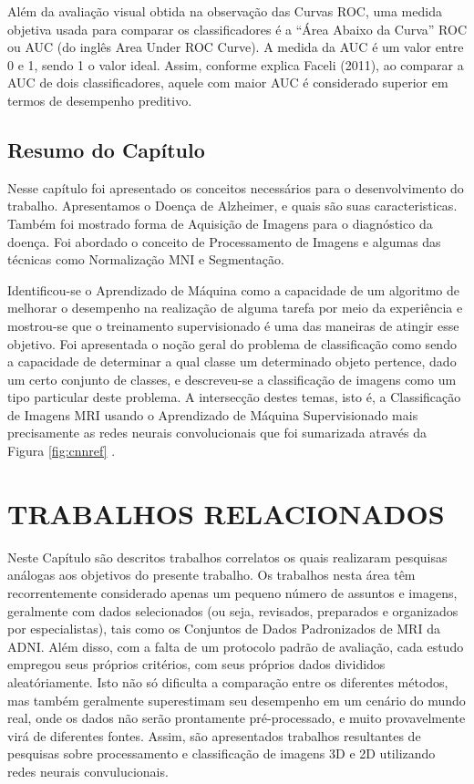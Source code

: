 \documentclass[openright]{UFRGS} %
\begin{document}
Além da avaliação visual obtida na observação das Curvas ROC, uma medida
objetiva usada para comparar os classificadores é a “Área Abaixo da Curva” ROC ou AUC (do inglês Area Under ROC Curve). A medida da AUC é um valor entre 0 e 1, sendo 1 o valor ideal. Assim, conforme explica Faceli (2011), ao comparar a AUC de dois
classificadores, aquele com maior AUC é considerado superior em termos de desempenho preditivo.


\section{Resumo do Capítulo}

Nesse capítulo foi apresentado os conceitos necessários para o desenvolvimento do trabalho. Apresentamos o Doença de Alzheimer, e quais são suas caracteristicas. Também foi mostrado forma de Aquisição de Imagens para o diagnóstico da doença. Foi abordado o conceito de Processamento de Imagens e algumas das técnicas como Normalização MNI e Segmentação.

Identificou-se o Aprendizado de Máquina como a capacidade de um algoritmo
de melhorar o desempenho na realização de alguma tarefa por meio da experiência e
mostrou-se que o treinamento supervisionado é uma das maneiras de atingir esse objetivo.
Foi apresentada o noção geral do problema de classificação como sendo a capacidade de
determinar a qual classe um determinado objeto pertence, dado um certo conjunto de
classes, e descreveu-se a classificação de imagens como um tipo particular deste problema.
A intersecção destes temas, isto é, a Classificação de Imagens MRI usando o Aprendizado de
Máquina Supervisionado mais precisamente as redes neurais convolucionais que foi sumarizada através da Figura \ref{fig:cnnref} .


\chapter{TRABALHOS RELACIONADOS}

Neste Capítulo são descritos trabalhos correlatos os quais realizaram pesquisas análogas
aos objetivos do presente trabalho. Os trabalhos nesta área têm recorrentemente considerado apenas um pequeno número de assuntos e
imagens, geralmente com dados selecionados (ou seja, revisados, preparados e organizados por especialistas), tais
como os Conjuntos de Dados Padronizados de MRI da ADNI. Além disso, com a falta de um protocolo padrão de avaliação, cada estudo empregou seus próprios critérios, com seus próprios dados divididos aleatóriamente. Isto não só dificulta a comparação entre os diferentes métodos, mas também geralmente
superestimam seu desempenho em um cenário do mundo real, onde os dados não serão prontamente
pré-processado, e muito provavelmente virá de diferentes fontes. 
Assim, são apresentados trabalhos resultantes de pesquisas sobre  processamento e classificação de imagens 3D e 2D utilizando  redes neurais convulucionais.
\end{document}
